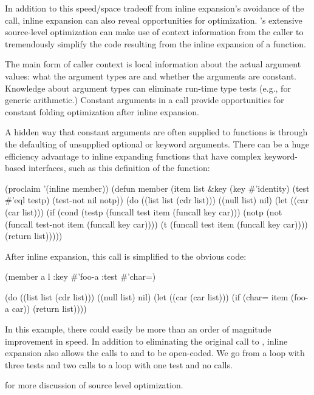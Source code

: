 In addition to this speed/space tradeoff from inline expansion's
avoidance of the call, inline expansion can also reveal opportunities
for optimization.  \python{}'s extensive source-level optimization can
make use of context information from the caller to tremendously
simplify the code resulting from the inline expansion of a function.

The main form of caller context is local information about the actual
argument values: what the argument types are and whether the arguments
are constant.  Knowledge about argument types can eliminate run-time
type tests (e.g., for generic arithmetic.)  Constant arguments in a
call provide opportunities for constant folding optimization after
inline expansion.

A hidden way that constant arguments are often supplied to functions
is through the defaulting of unsupplied optional or keyword arguments.
There can be a huge efficiency advantage to inline expanding functions
that have complex keyword-based interfaces, such as this definition of
the  function:
\begin{lisp}
(proclaim '(inline member))
(defun member (item list &key
                    (key #'identity)
                    (test #'eql testp)
                    (test-not nil notp))
  (do ((list list (cdr list)))
      ((null list) nil)
    (let ((car (car list)))
      (if (cond (testp
                 (funcall test item (funcall key car)))
                (notp
                 (not (funcall test-not item (funcall key car))))
                (t
                 (funcall test item (funcall key car))))
          (return list)))))

\end{lisp}
After inline expansion, this call is simplified to the obvious code:
\begin{lisp}
(member a l :key #'foo-a :test #'char=) \result{}

(do ((list list (cdr list)))
    ((null list) nil)
  (let ((car (car list)))
    (if (char= item (foo-a car))
        (return list))))
\end{lisp}
In this example, there could easily be more than an order of magnitude
improvement in speed.  In addition to eliminating the original call to
, inline expansion also allows the calls to 
and  to be open-coded.  We go from a loop with three tests
and two calls to a loop with one test and no calls.

 for more discussion of source level
optimization.


